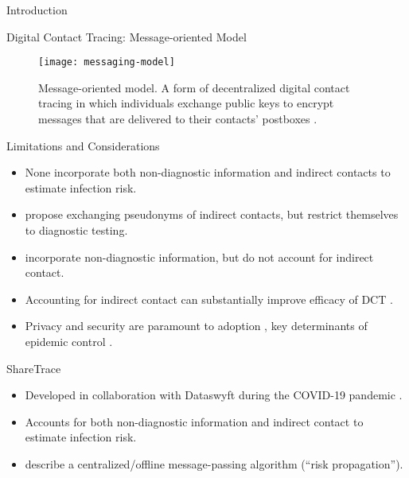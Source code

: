 \documentclass[11pt]{beamer}
\begin{document}
\begin{section}{Introduction}
\begin{frame}{Digital Contact Tracing: Message-oriented Model}
\begin{figure}
  \centering
  \texttt{[image: messaging-model]}
  \caption[Message-oriented model]{Message-oriented model. A form of decentralized digital contact tracing in which individuals exchange public keys to encrypt messages that are delivered to their contacts' postboxes \cite{Reichert2021}.}
\end{figure}
\end{frame}

\begin{frame}{Limitations and Considerations}
\begin{itemize}
  \item None incorporate both non-diagnostic information and indirect contacts to estimate infection risk.
  \pause
  \item \citet{Cherini2023} propose exchanging pseudonyms of indirect contacts, but restrict themselves to diagnostic testing.
  \pause
  \item \citet{Gupta2023} incorporate non-diagnostic information, but do not account for indirect contact.
  \pause
  \item Accounting for indirect contact can substantially improve efficacy of DCT \citep{PozoMartin2023}.
  \pause
  \item Privacy and security are paramount to adoption \citep{Oyibo2022, Afroogh2022}, key determinants of epidemic control \citep{PozoMartin2023}.
\end{itemize}
\end{frame}

\begin{frame}{ShareTrace}
\begin{itemize}
  \item Developed in collaboration with Dataswyft during the COVID-19 pandemic \citep{Ayday2020}.
  \pause
  \item Accounts for both non-diagnostic information and indirect contact to estimate infection risk.
  \pause
  \item \citet{Ayday2021} describe a centralized/offline message-passing algorithm (``risk propagation'').
\end{itemize}
\end{frame}


\end{section}
\end{document}
